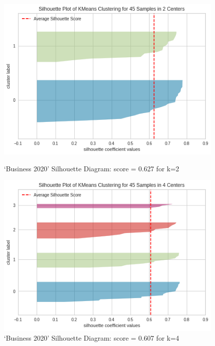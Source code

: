 \begin{figure}[H]
\begin{minipage}{0.49\linewidth}
\centering
\includegraphics[width=\linewidth]{images/cluster 2.png}
\caption{`Business 2020' Silhouette Diagram: score = 0.627 for k=2}
\label{fig:cluster2}
\end{minipage}
\hfill
\begin{minipage}{0.49\linewidth}
\centering
\includegraphics[width=\linewidth]{images/cluster 4.png}
\caption{`Business 2020' Silhouette Diagram: score = 0.607 for k=4}
\label{fig:cluster4}
\end{minipage}
\end{figure}

